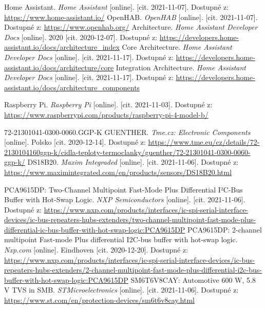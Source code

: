 \begin{thebibliography}{3}
Home Assistant. \textit{Home Assistant} [online]. [cit. 2021-11-07]. Dostupné z: \url{https://www.home-assistant.io/}
OpenHAB. \textit{OpenHAB} [online]. [cit. 2021-11-07]. Dostupné z: \url{https://www.openhab.org/}
Architecture. \textit{Home Assistant Developer Docs} [online]. 2020 [cit. 2020-12-07]. Dostupné z: \url{https://developers.home-assistant.io/docs/architecture\_index}
Core Architecture. \textit{Home Assistant Developer Docs} [online]. [cit. 2021-11-17]. Dostupné z: \url{https://developers.home-assistant.io/docs/architecture/core}
Integration Architecture. \textit{Home Assistant Developer Docs} [online]. [cit. 2021-11-17]. Dostupné z: \url{https://developers.home-assistant.io/docs/architecture_components}


Raspberry Pi. \textit{Raspberry Pi} [online]. [cit. 2021-11-03]. Dostupné z: \url{https://www.raspberrypi.com/products/raspberry-pi-4-model-b/}

72-21301041-0300-0060.GGP-K GUENTHER. \textit{Tme.cz: Electronic Components} [online]. Polsko [cit. 2020-12-14]. Dostupné z: \url{https://www.tme.eu/cz/details/72-2130104160ggp-k/cidla-teploty-termoclanky/guenther/72-21301041-0300-0060-ggp-k/}
DS18B20. \textit{Maxim Integraded} [online]. [cit. 2021-11-06]. Dostupné z: \url{https://www.maximintegrated.com/en/products/sensors/DS18B20.html}

PCA9615DP: Two-Channel Multipoint Fast-Mode Plus Differential I²C-Bus Buffer with Hot-Swap Logic. \textit{NXP Semiconductors} [online]. [cit. 2021-11-06]. Dostupné z: \url{https://www.nxp.com/products/interfaces/ic-spi-serial-interface-devices/ic-bus-repeaters-hubs-extenders/two-channel-multipoint-fast-mode-plus-differential-ic-bus-buffer-with-hot-swap-logic:PCA9615DP}
PCA9615DP: 2-channel multipoint Fast-mode Plus differential I2C-bus buffer with hot-swap logic. \textit{Nxp.com} [online]. Eindhoven [cit. 2020-12-20]. Dostupné z: \url{https://www.nxp.com/products/interfaces/ic-spi-serial-interface-devices/ic-bus-repeaters-hubs-extenders/2-channel-multipoint-fast-mode-plus-differential-i2c-bus-buffer-with-hot-swap-logic:PCA9615DP}
SM6T6V8CAY: Automotive 600 W, 5.8 V TVS in SMB. \textit{STMicroelectronics} [online]. [cit. 2021-11-06]. Dostupné z: \url{https://www.st.com/en/protection-devices/sm6t6v8cay.html}



\end{thebibliography}
